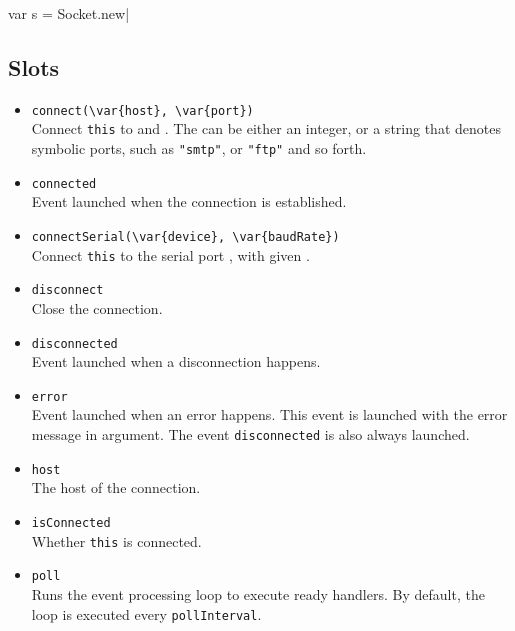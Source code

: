 \begin{urbiscript}
var s = Socket.new|
\end{urbiscript}

\subsection{Slots}
\begin{itemize}

\item \lstinline|connect(\var{host}, \var{port})|\\
  Connect \lstinline|this| to  and .  The
   can be either an integer, or a string that denotes
  symbolic ports, such as \lstinline|"smtp"|, or \lstinline|"ftp"| and
  so forth.

\item \lstinline|connected|\\
  Event launched when the connection is established.

\item \lstinline|connectSerial(\var{device}, \var{baudRate})|\\
  Connect \lstinline|this| to the serial port , with given
  .

\item \lstinline|disconnect|\\
  Close the connection.

\item \lstinline|disconnected|\\
  Event launched when a disconnection happens.

\item \lstinline|error|\\
  Event launched when an error happens. This event is launched with
  the error message in argument. The event \lstinline|disconnected| is
  also always launched.

\item \lstinline|host|\\
  The host of the connection.

\item \lstinline|isConnected|\\
  Whether \lstinline|this| is connected.

\item \lstinline|poll|\\
  Runs the event processing loop to execute ready handlers. By
  default, the loop is executed every \lstinline|pollInterval|.


\end{itemize}
